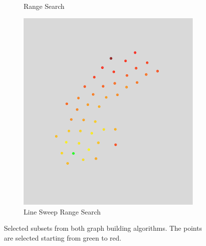 \begin{figure}[H]
\begin{subfigure}[b]{0.32\linewidth}
	\caption{\small \kdTree Range Search} 
    \label{fig:kd_10_sweden} 
    \vspace{4ex}
  \end{subfigure}%
  \begin{subfigure}[b]{0.32\linewidth}
    \centering
    \includegraphics[width=0.9\linewidth]{Pictures/ls_10_sweden} 
	\caption{\small Line Sweep Range Search} 
    \label{fig:ls_10_sweden} 
    \vspace{4ex}
  \end{subfigure}
  \caption{Selected subsets from both graph building algorithms. The points are selected starting from green to red.}
  \label{fig:kd_ls_sweden} 
\end{figure}

